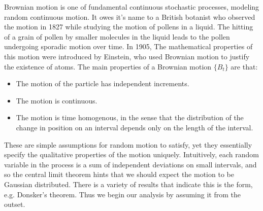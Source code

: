 Brownian motion is one of fundamental continuous stochastic processes, modeling random continuous motion. It owes it's name to a British botanist who observed the motion in 1827 while studying the motion of pollens in a liquid. The hitting of a grain of pollen by smaller molecules in the liquid leads to the pollen undergoing sporadic motion over time. In 1905, The mathematical properties of this motion were introduced by Einstein, who used Brownian motion to justify the existence of atoms. The main properties of a Brownian motion $\{ B_t \}$ are that:
%
\begin{itemize}
    \item The motion of the particle has independent increments.
    \item The motion is continuous.
    \item The motion is time homogenous, in the sense that the distribution of the change in position on an interval depends only on the length of the interval.
\end{itemize}
%
These are simple assumptions for random motion to satisfy, yet they essentially specify the qualitative properties of the motion uniquely. Intuitively, each random variable in the process is a sum of independent deviations on small intervals, and so the central limit theorem hints that we should expect the motion to be Gaussian distributed. There is a variety of results that indicate this is the form, e.g. Donsker's theorem. Thus we begin our analysis by assuming it from the outset.

